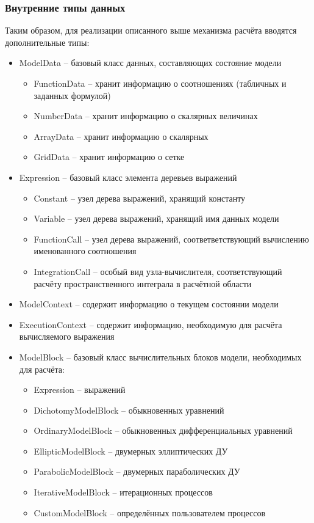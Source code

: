 \subsubsection{Внутренние типы данных}
Таким образом, для реализации описанного выше механизма расчёта вводятся 
дополнительные типы:
\begin{itemize}
    \item ModelData -- базовый класс данных, составляющих состояние модели
    \begin{itemize}
        \item FunctionData -- хранит информацию о соотношениях (табличных и 
        заданных формулой)
        \item NumberData -- хранит информацию о скалярных величинах
        \item ArrayData -- хранит информацию о скалярных
        \item GridData -- хранит информацию о сетке
    \end{itemize}
    \item Expression -- базовый класс элемента деревьев выражений
    \begin{itemize}
        \item Constant -- узел дерева выражений, хранящий константу
        \item Variable -- узел дерева выражений, хранящий имя данных модели
        \item FunctionCall -- узел дерева выражений, соответветствующий 
        вычислению именованного соотношения
        \item IntegrationCall -- особый вид узла-вычислителя, соответствующий 
        расчёту пространственного интеграла в расчётной области
    \end{itemize}
    \item ModelContext -- содержит информацию о текущем состоянии модели
    \item ExecutionContext -- содержит информацию, необходимую для расчёта 
    вычисляемого выражения
    \item ModelBlock -- базовый класс вычислительных блоков модели, необходимых 
    для расчёта:
    \begin{itemize}
        \item Expression -- выражений
        \item DichotomyModelBlock -- обыкновенных уравнений
        \item OrdinaryModelBlock -- обыкновенных дифференциальных уравнений
        \item EllipticModelBlock -- двумерных эллиптических ДУ
        \item ParabolicModelBlock -- двумерных параболических ДУ
        \item IterativeModelBlock -- итерационных процессов
        \item CustomModelBlock -- определённых пользователем процессов
    \end{itemize}
\end{itemize}

